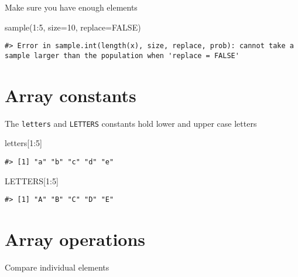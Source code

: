 \documentclass[
]{book}
\newenvironment{Shaded}{\begin{snugshade}}{\end{snugshade}}
\newcommand{\AttributeTok}[1]{\textcolor[rgb]{0.77,0.63,0.00}{#1}}
\newcommand{\ConstantTok}[1]{\textcolor[rgb]{0.00,0.00,0.00}{#1}}
\newcommand{\DecValTok}[1]{\textcolor[rgb]{0.00,0.00,0.81}{#1}}
\newcommand{\FunctionTok}[1]{\textcolor[rgb]{0.00,0.00,0.00}{#1}}
\newcommand{\NormalTok}[1]{#1}
\newcommand{\SpecialCharTok}[1]{\textcolor[rgb]{0.00,0.00,0.00}{#1}}
\begin{document}
Make sure you have enough elements

\begin{Shaded}
\begin{Highlighting}[]
\FunctionTok{sample}\NormalTok{(}\DecValTok{1}\SpecialCharTok{:}\DecValTok{5}\NormalTok{, }\AttributeTok{size=}\DecValTok{10}\NormalTok{, }\AttributeTok{replace=}\ConstantTok{FALSE}\NormalTok{)}
\end{Highlighting}
\end{Shaded}

\begin{verbatim}
#> Error in sample.int(length(x), size, replace, prob): cannot take a sample larger than the population when 'replace = FALSE'
\end{verbatim}

\hypertarget{array-constants}{%
\section{Array constants}\label{array-constants}}

The \texttt{letters} and \texttt{LETTERS} constants hold lower and upper case letters

\begin{Shaded}
\begin{Highlighting}[]
\NormalTok{letters[}\DecValTok{1}\SpecialCharTok{:}\DecValTok{5}\NormalTok{]}
\end{Highlighting}
\end{Shaded}

\begin{verbatim}
#> [1] "a" "b" "c" "d" "e"
\end{verbatim}

\begin{Shaded}
\begin{Highlighting}[]
\NormalTok{LETTERS[}\DecValTok{1}\SpecialCharTok{:}\DecValTok{5}\NormalTok{]}
\end{Highlighting}
\end{Shaded}

\begin{verbatim}
#> [1] "A" "B" "C" "D" "E"
\end{verbatim}

\hypertarget{array-operations}{%
\section{Array operations}\label{array-operations}}

Compare individual elements
\end{document}
